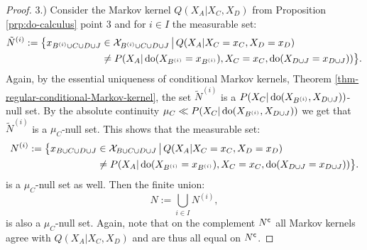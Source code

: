 \begin{proof}
3.) Consider the Markov kernel $Q(X_A|X_C,X_D)$ from Proposition \ref{prp:do-calculus} point 3 and
for $i \in I$ the measurable set:
\begin{align*}
    \tilde N^{(i)} := \bigl\{ x_{B^{(i)} \cup C \cup D \cup J} &\in \mathcal{X}_{B^{(i)} \cup C \cup D \cup J} \,\big|\,
        Q(X_A|X_C=x_C,X_D=x_D)\\ 
       &\neq P(X_A|\operatorname{do}(X_{B^{(i)}}=x_{B^{(i)}}),X_C=x_C,\operatorname{do}(X_{D\cup J}=x_{D \cup J})) \bigr\}.
\end{align*}
Again, by the essential uniqueness of conditional Markov kernels, Theorem \ref{thm-regular-conditional-Markov-kernel}, the set $\tilde N^{(i)}$ is a $P(X_C|\operatorname{do}(X_{B^{(i)}},X_{D\cup J}))$-null set. By the absolute continuity $ \mu_C \ll P(X_C|\operatorname{do}(X_{B^{(i)}},X_{D\cup J}))$ we get that $\tilde N^{(i)}$ is a $\mu_C$-null set. This shows that the measurable set:
\begin{align*}
    N^{(i)} := \bigl\{ x_{B \cup C \cup D \cup J} &\in \mathcal{X}_{B \cup C \cup D \cup J} \,\big|\,
        Q(X_A|X_C=x_C,X_D=x_D)\\ 
       &\neq P(X_A|\operatorname{do}(X_{B^{(i)}}=x_{B^{(i)}}),X_C=x_C,\operatorname{do}(X_{D\cup J}=x_{D \cup J})) \bigr\}.
\end{align*}
is a $\mu_C$-null set as well. Then the finite union:
 \[ N := \bigcup_{i \in I} N^{(i)}, \]
 is also a $\mu_C$-null set. 
Again, note that on the complement $N^{\mathsf{c}}$ all Markov kernels agree with $Q(X_A|X_C,X_D)$ and are thus all equal on $N^{\mathsf{c}}$.
\end{proof}
